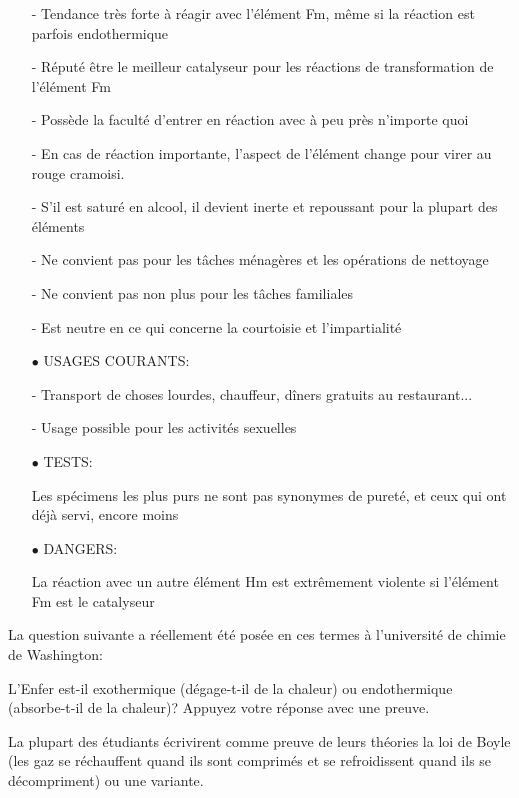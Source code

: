 \begin{itemize}
- Tendance très forte à réagir avec l'élément Fm, même si la réaction est parfois endothermique

- Réputé être le meilleur catalyseur pour les réactions de transformation de l'élément Fm

- Possède la faculté d'entrer en réaction avec à peu près n'importe quoi

- En cas de réaction importante, l'aspect de l'élément change pour virer au rouge cramoisi.

- S'il est saturé en alcool, il devient inerte et repoussant pour la plupart des éléments

- Ne convient pas pour les tâches ménagères et les opérations de nettoyage

- Ne convient pas non plus pour les tâches familiales

- Est neutre en ce qui concerne la courtoisie et l'impartialité

	\item[$\bullet$] USAGES COURANTS:

- Transport de choses lourdes, chauffeur, dîners gratuits au restaurant...

- Usage possible pour les activités sexuelles

	\item[$\bullet$] TESTS:

Les spécimens les plus purs ne sont pas synonymes de pureté, et ceux qui ont déjà servi, encore moins

	\item[$\bullet$] DANGERS:

La réaction avec un autre élément Hm est extrêmement violente si l'élément Fm est le catalyseur
\end{itemize}

\begin{center}\underline{\hspace{5 cm}}\end{center}

La question suivante a réellement été posée en ces termes à l'université de chimie de Washington:

L'Enfer est-il exothermique (dégage-t-il de la chaleur) ou endothermique (absorbe-t-il de la chaleur)? Appuyez votre réponse avec une preuve.

La plupart des étudiants écrivirent comme preuve de leurs théories la loi de Boyle (les gaz se réchauffent quand ils sont comprimés et se refroidissent quand ils se décompriment) ou une variante.

